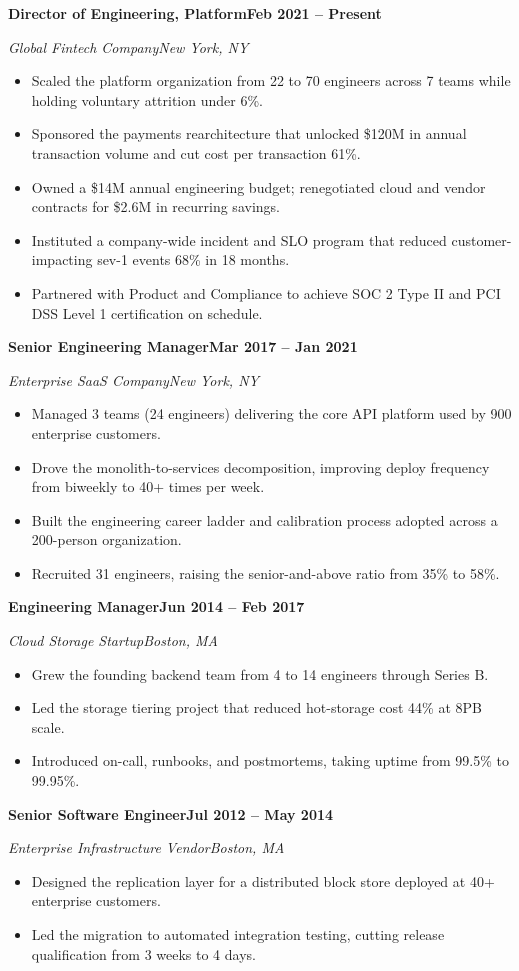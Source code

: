 \documentclass[letterpaper,11pt]{article}
\newcommand{\rRole}[4]{%
  \vspace{4pt}%
  \noindent\textbf{#1}\hfill\textbf{#4}\par
  \noindent\textit{\color{muted}#2}\hfill\textit{\color{muted}#3}\par
  \vspace{2pt}%
}
\newenvironment{rBullets}
  {\begin{itemize}[leftmargin=14pt,itemsep=3pt,parsep=0pt,topsep=3pt,
                   partopsep=0pt,label=\textbullet]}
  {\end{itemize}}
\begin{document}
\rRole{Director of Engineering, Platform}{Global Fintech Company}{New York, NY}{Feb 2021 -- Present}
\begin{rBullets}
  \item Scaled the platform organization from 22 to 70 engineers across 7 teams while holding voluntary attrition under 6\%.
  \item Sponsored the payments rearchitecture that unlocked \$120M in annual transaction volume and cut cost per transaction 61\%.
  \item Owned a \$14M annual engineering budget; renegotiated cloud and vendor contracts for \$2.6M in recurring savings.
  \item Instituted a company-wide incident and SLO program that reduced customer-impacting sev-1 events 68\% in 18 months.
  \item Partnered with Product and Compliance to achieve SOC 2 Type II and PCI DSS Level 1 certification on schedule.
\end{rBullets}

\rRole{Senior Engineering Manager}{Enterprise SaaS Company}{New York, NY}{Mar 2017 -- Jan 2021}
\begin{rBullets}
  \item Managed 3 teams (24 engineers) delivering the core API platform used by 900 enterprise customers.
  \item Drove the monolith-to-services decomposition, improving deploy frequency from biweekly to 40+ times per week.
  \item Built the engineering career ladder and calibration process adopted across a 200-person organization.
  \item Recruited 31 engineers, raising the senior-and-above ratio from 35\% to 58\%.
\end{rBullets}

\rRole{Engineering Manager}{Cloud Storage Startup}{Boston, MA}{Jun 2014 -- Feb 2017}
\begin{rBullets}
  \item Grew the founding backend team from 4 to 14 engineers through Series B.
  \item Led the storage tiering project that reduced hot-storage cost 44\% at 8PB scale.
  \item Introduced on-call, runbooks, and postmortems, taking uptime from 99.5\% to 99.95\%.
\end{rBullets}

\rRole{Senior Software Engineer}{Enterprise Infrastructure Vendor}{Boston, MA}{Jul 2012 -- May 2014}
\begin{rBullets}
  \item Designed the replication layer for a distributed block store deployed at 40+ enterprise customers.
  \item Led the migration to automated integration testing, cutting release qualification from 3 weeks to 4 days.
\end{rBullets}
\end{document}
